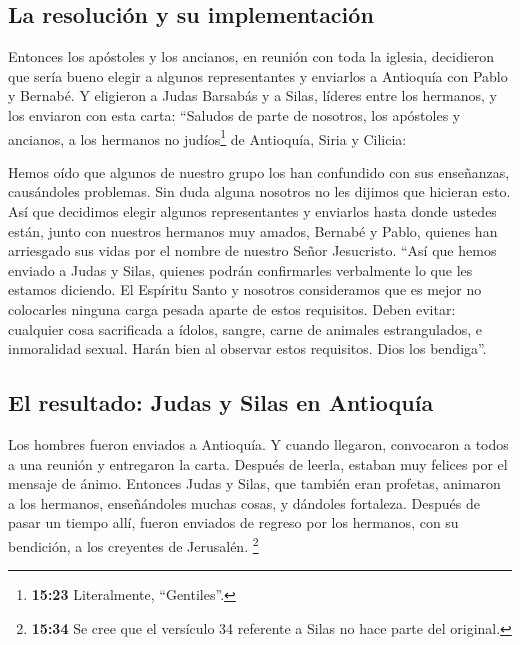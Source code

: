 \hypertarget{la-resoluciuxf3n-y-su-implementaciuxf3n}{%
\subsection{La resolución y su
implementación}\label{la-resoluciuxf3n-y-su-implementaciuxf3n}}

 Entonces los apóstoles y los ancianos, en reunión con
toda la iglesia, decidieron que sería bueno elegir a algunos
representantes y enviarlos a Antioquía con Pablo y Bernabé. Y eligieron
a Judas Barsabás y a Silas, líderes entre los hermanos, 
y los enviaron con esta carta: ``Saludos de parte de nosotros, los
apóstoles y ancianos, a los hermanos no judíos\footnote{\textbf{15:23}
  Literalmente, ``Gentiles''.} de Antioquía, Siria y Cilicia:

 Hemos oído que algunos de nuestro grupo los han
confundido con sus enseñanzas, causándoles problemas. Sin duda alguna
nosotros no les dijimos que hicieran esto.  Así que
decidimos elegir algunos representantes y enviarlos hasta donde ustedes
están, junto con nuestros hermanos muy amados, Bernabé y Pablo,
 quienes han arriesgado sus vidas por el nombre de
nuestro Señor Jesucristo.  ``Así que hemos enviado a
Judas y Silas, quienes podrán confirmarles verbalmente lo que les
estamos diciendo.  El Espíritu Santo y nosotros
consideramos que es mejor no colocarles ninguna carga pesada aparte de
estos requisitos.  Deben evitar: cualquier cosa
sacrificada a ídolos, sangre, carne de animales estrangulados, e
inmoralidad sexual. Harán bien al observar estos requisitos. Dios los
bendiga''.

\hypertarget{el-resultado-judas-y-silas-en-antioquuxeda}{%
\subsection{El resultado: Judas y Silas en
Antioquía}\label{el-resultado-judas-y-silas-en-antioquuxeda}}

 Los hombres fueron enviados a Antioquía. Y cuando
llegaron, convocaron a todos a una reunión y entregaron la carta.
 Después de leerla, estaban muy felices por el mensaje de
ánimo.  Entonces Judas y Silas, que también eran
profetas, animaron a los hermanos, enseñándoles muchas cosas, y dándoles
fortaleza.  Después de pasar un tiempo allí, fueron
enviados de regreso por los hermanos, con su bendición, a los creyentes
de Jerusalén.  \footnote{\textbf{15:34} Se cree que el
  versículo 34 referente a Silas no hace parte del original.}

